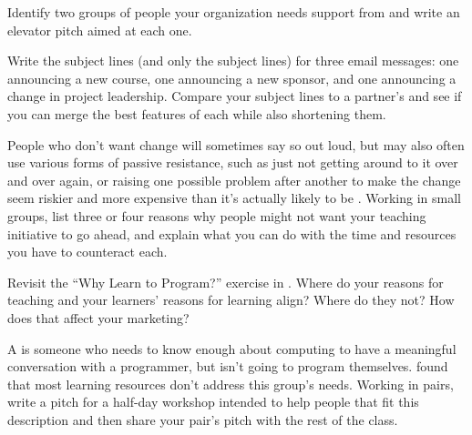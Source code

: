 
Identify two groups of people your organization needs support from
and write an elevator pitch aimed at each one.


Write the subject lines (and only the subject lines) for three email messages:
one announcing a new course,
one announcing a new sponsor,
and one announcing a change in project leadership.
Compare your subject lines to a partner's
and see if you can merge the best features of each while also shortening them.


People who don't want change will sometimes say so out loud,
but may also often use various forms of passive resistance,
such as just not getting around to it over and over again,
or raising one possible problem after another
to make the change seem riskier and more expensive than it's actually likely to be
\cite{Scot1987}.
Working in small groups,
list three or four reasons why people might not want your teaching initiative to go ahead,
and explain what you can do with the time and resources you have to counteract each.


Revisit the ``Why Learn to Program?'' exercise in .
Where do your reasons for teaching and your learners' reasons for learning align?
Where do they not?
How does that affect your marketing?


A 
is someone who needs to know enough about computing
to have a meaningful conversation with a programmer,
but isn't going to program themselves.
\cite{Wang2018} found that most learning resources don't address this group's needs.
Working in pairs,
write a pitch for a half-day workshop intended to help people that fit this description
and then share your pair's pitch with the rest of the class.
